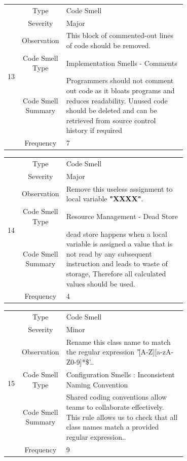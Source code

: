 \documentclass[12pt,letterpaper]{report}
\begin{document}
\begin{table}
    \begin{tabular}{|c|c|p{0.7\linewidth}|}
    \hline   
    \multirow{6}{*}{13}
        & Type & Code Smell \\
    \cline{2-3}
        & Severity & Major \\
    \cline{2-3}
       & Observation & This block of commented-out lines of code should be removed. \\
    \cline{2-3}
       & Code Smell Type & Implementation Smells - Comments   \\
    \cline{2-3}
       & Code Smell Summary & Programmers should not comment out code as it bloats programs and reduces readability. Unused code should be deleted and can be retrieved from source control history if required \\
    \cline{2-3}
       & Frequency & 7 \\
    \hline
    \end{tabular}
\end{table}

\begin{table}
    \begin{tabular}{|c|c|p{0.7\linewidth}|}
    \hline   
    \multirow{6}{*}{14}
        & Type & Code Smell \\
    \cline{2-3}
        & Severity & Major \\
    \cline{2-3}
       & Observation & Remove this useless assignment to local variable \textbf{"XXXX"}. \\
    \cline{2-3}
       & Code Smell Type & Resource Management - Dead Store   \\
    \cline{2-3}
       & Code Smell Summary &  dead store happens when a local variable is assigned a value that is not read by any subsequent instruction and leads to waste of storage, Therefore all calculated values should be used. \\
    \cline{2-3}
       & Frequency & 4 \\
    \hline
    \end{tabular}
\end{table}

\begin{table}
    \begin{tabular}{|c|c|p{0.7\linewidth}|}
    \hline   
    \multirow{6}{*}{15}
        & Type & Code Smell \\
    \cline{2-3}
        & Severity & Minor \\
    \cline{2-3}
       & Observation & Rename this class name to match the regular expression '\^[A-Z][a-zA-Z0-9]*\$'.. \\
    \cline{2-3}
       & Code Smell Type & Configuration Smells : Inconsistent Naming Convention  \\
    \cline{2-3}
       & Code Smell Summary &  Shared coding conventions allow teams to collaborate effectively. This rule allows us to check that all class names match a provided regular expression.. \\
    \cline{2-3}
       & Frequency & 9 \\
    \hline
    \end{tabular}
\end{table}
\end{document}
